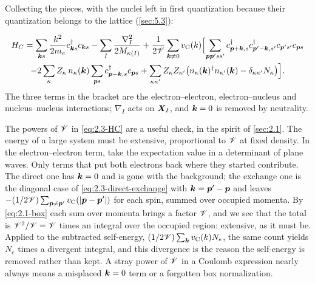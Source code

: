 Collecting the pieces, with the nuclei left in first quantization because their quantization belongs to the lattice (\cref{sec:5.3}):
\begin{keyresult}
\begin{multline}
  H_C = \sum_{\bm{k}s}\frac{k^2}{2m_e}c^\dagger_{\bm{k}s}c_{\bm{k}s} - \sum_I\frac{\nabla_I^2}{2M_{\kappa(I)}}
  + \frac{1}{2\mathscr{V}}\sum_{\bm{k}\ne0}v_{\mathrm{C}}(k)\Bigl[\sum_{\bm{p}\bm{p}'ss'}c^\dagger_{\bm{p}+\bm{k},s}c^\dagger_{\bm{p}'-\bm{k},s'}c_{\bm{p}'s'}c_{\bm{p}s}\\
  - 2\sum_\kappa Z_\kappa\,n_\kappa(\bm{k})\sum_{\bm{p}s}c^\dagger_{\bm{p}-\bm{k},s}c_{\bm{p}s}
  + \sum_{\kappa\kappa'}Z_\kappa Z_{\kappa'}\bigl(n_\kappa(\bm{k})^\dagger n_{\kappa'}(\bm{k}) - \delta_{\kappa\kappa'}N_\kappa\bigr)\Bigr] .
  \label{eq:2.3-HC}
\end{multline}
The three terms in the bracket are the electron--electron, electron--nucleus and nucleus--nucleus interactions; $\nabla_I$ acts on $\bm{X}_I$, and $\bm{k} = 0$ is removed by neutrality.
\end{keyresult}
The powers of $\mathscr{V}$ in \cref{eq:2.3-HC} are a useful check, in the spirit of \cref{sec:2.1}. The energy of a large system must be extensive, proportional to $\mathscr{V}$ at fixed density. In the electron--electron term, take the expectation value in a determinant of plane waves. Only terms that put both electrons back where they started contribute. The direct one has $\bm{k} = 0$ and is gone with the background; the exchange one is the diagonal case of \cref{eq:2.3-direct-exchange} with $\bm{k} = \bm{p}' - \bm{p}$ and leaves $-(1/2\mathscr{V})\sum_{\bm{p}\ne\bm{p}'}v_{\mathrm{C}}(|\bm{p} - \bm{p}'|)$ for each spin, summed over occupied momenta. By \cref{eq:2.1-box} each sum over momenta brings a factor $\mathscr{V}$, and we see that the total is $\mathscr{V}^2/\mathscr{V} = \mathscr{V}$ times an integral over the occupied region: extensive, as it must be. Applied to the subtracted self-energy, $(1/2\mathscr{V})\sum_{\bm{k}}v_{\mathrm{C}}(k)N_e$, the same count yields $N_e$ times a divergent integral, and this divergence is the reason the self-energy is removed rather than kept. A stray power of $\mathscr{V}$ in a Coulomb expression nearly always means a misplaced $\bm{k} = 0$ term or a forgotten box normalization.


